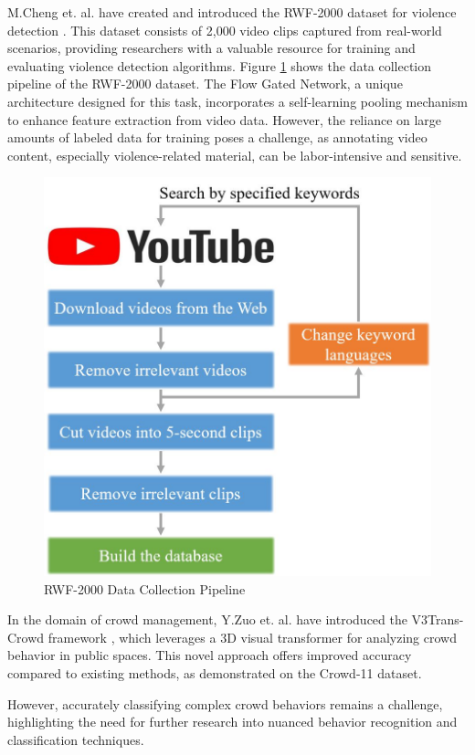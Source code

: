 \noindent M.Cheng et. al. have created and introduced the RWF-2000 dataset for violence detection \cite{ourdataset}. This dataset consists of 2,000 video clips captured from real-world scenarios, providing researchers with a valuable resource for training and evaluating violence detection algorithms. Figure \ref{fig:rwfpipeline} shows the data collection pipeline of the RWF-2000 dataset. The Flow Gated Network, a unique architecture designed for this task, incorporates a self-learning pooling mechanism to enhance feature extraction from video data. However, the reliance on large amounts of labeled data for training poses a challenge, as annotating video content, especially violence-related material, can be labor-intensive and sensitive. \\
\begin{figure}[htbp!]
    \centering
    \includegraphics[width=0.7\linewidth]{Images/rwf_pipeline.jpg}
    \caption{RWF-2000 Data Collection Pipeline}
    \label{fig:rwfpipeline}
\end{figure}

\vspace{-5mm}

\noindent In the domain of crowd management, Y.Zuo et. al. have introduced the V3Trans-Crowd framework \cite{vvit}, which leverages a 3D visual transformer for analyzing crowd behavior in public spaces. This novel approach offers improved accuracy compared to existing methods, as demonstrated on the Crowd-11 dataset. 

\clearpage

\noindent However, accurately classifying complex crowd behaviors remains a challenge, highlighting the need for further research into nuanced behavior recognition and classification techniques.

